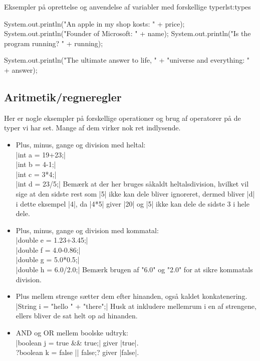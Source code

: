 {\begin{JavaCode}{Eksempler på oprettelse og anvendelse af variabler med forskellige typer}{lst:types}
{{			System.out.println("An apple in my shop kosts: " 
						+ price);
			System.out.println("Founder of Microsoft: " + name);
			System.out.println("Is the program running? " 
						+ running);
			
			System.out.println("The ultimate answer to life, "
						+ "universe and everything: " 
						+ answer);
		}
	}
\end{JavaCode}

\subsection{Aritmetik/regneregler}
Her er nogle eksempler på forskellige operationer og brug af operatorer på de typer vi har set. Mange af dem virker nok ret indlysende.

\begin{itemize}
	\item Plus, minus, gange og division med heltal: \\
	\JavaInline|int a = 19+23;| \\
	\JavaInline|int b = 4-1;| \\
	\JavaInline|int c = 3*4;| \\
	\JavaInline|int d = 23/5;| Bemærk at der her bruges såkaldt heltalsdivision, hvilket vil sige at den sidste rest som \JavaInline|5| ikke kan dele bliver ignoreret, dermed bliver \JavaInline|d| i dette eksempel \JavaInline|4|, da \JavaInline|4*5| giver \JavaInline|20| og \JavaInline|5| ikke kan dele de sidste 3 i hele dele.
	
	\item Plus, minus, gange og division med kommatal:\\
	\JavaInline|double e = 1.23+3.45;|\\
	\JavaInline|double f = 4.0-0.86;|\\
	\JavaInline|double g = 5.0*0.5;|\\
	\JavaInline|double h = 6.0/2.0;| Bemærk brugen af "6.0" og "2.0" for at sikre kommatals division.
	
	\item Plus mellem strenge sætter dem efter hinanden, også kaldet konkatenering.\\
	\JavaInline|String i = "hello " + "there";| Husk at inkludere mellemrum i en af strengene, ellers bliver de sat helt op ad hinanden.
	
	\item AND og OR mellem boolske udtryk:\\
	\JavaInline|boolean j = true && true;| giver \JavaInline|true|.\\
	\JavaInline?boolean k = false || false;? giver \JavaInline|false|.
	

\end{itemize}}
